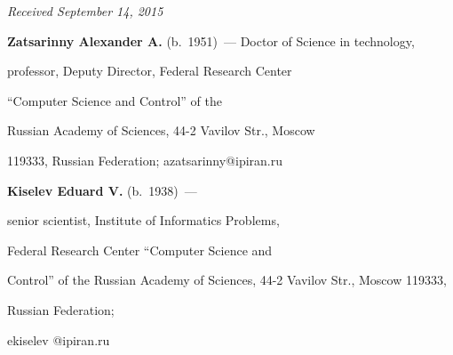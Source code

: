 \vspace*{-1pt}



\hfill{\small\textit{Received September 14, 2015}}





\Contr



      \noindent

      \textbf{Zatsarinny Alexander A.} (b.\ 1951)~--- Doctor of Science in technology, 

professor, Deputy Director, Federal Research Center 

``Computer Science and Control'' of the

Russian Academy of Sciences, 44-2 Vavilov Str., Moscow 

119333, Russian Federation; azatsarinny@ipiran.ru

      

      \vspace*{3pt}

      

\noindent

\textbf{Kiselev Eduard V.} (b.\ 1938)~---

senior scientist, Institute of Informatics Problems, 

Federal Research Center ``Computer Science and 

Control'' of the Russian Academy of Sciences, 44-2 Vavilov Str., Moscow 119333, 

Russian Federation;\linebreak

 ekiselev @ipiran.ru



 \label{end\stat}





\renewcommand{\bibname}{\protect\rm Литература}

